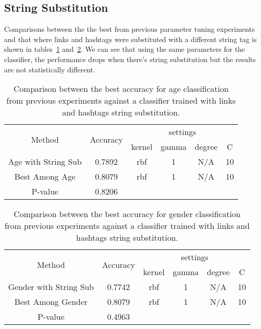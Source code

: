 \documentclass[a4paper]{llncs}
\begin{document}
\subsection{String Substitution}
Comparisons between the the best from previous parameter tuning experiments and that where links and hashtags were substituted with a different string tag is shown in tables~\ref{table:AgeStringSub} and~\ref{table:GenderStringSub}. We can see that using the same parameters for the classifier, the performance drops when there's string substitution but the results are not statistically different. 
\begin{table}[!htbp]
\centering
\begin{tabular}{|c|c|c|c|c|c|}
\hline
\multirow{2}{*}{Method} & \multirow{2}{*}{Accuracy} & \multicolumn{4}{c|}{settings} \\ \cline{3-6} 
                        &                           & kernel  & gamma & degree & C  \\ \hline
Age with String Sub     & 0.7892                    & rbf     & 1     & N/A    & 10 \\ \hline
Best Among Age          & 0.8079                    & rbf     & 1     & N/A    & 10 \\ \hline
P-value                 & 0.8206                    &         &       &        &    \\ \hline
\end{tabular}
\caption{Comparison between the best accuracy for age classification from previous experiments against a classifier trained with links and hashtags string substitution.}
\label{table:AgeStringSub}
\end{table}


\begin{table}[!htbp]
\centering
\begin{tabular}{|c|c|c|c|c|c|}
\hline
\multirow{2}{*}{Method} & \multirow{2}{*}{Accuracy} & \multicolumn{4}{c|}{settings} \\ \cline{3-6} 
                        &                           & kernel  & gamma & degree & C  \\ \hline
Gender with String Sub  & 0.7742                    & rbf     & 1     & N/A    & 10 \\ \hline
Best Among Gender          & 0.8079                    & rbf     & 1     & N/A    & 10 \\ \hline
P-value                 & 0.4963                    &         &       &        &    \\ \hline
\end{tabular}
\caption{Comparison between the best accuracy for gender classification from previous experiments against a classifier trained with links and hashtags string substitution.}
\label{table:GenderStringSub}
\end{table}
\end{document}
